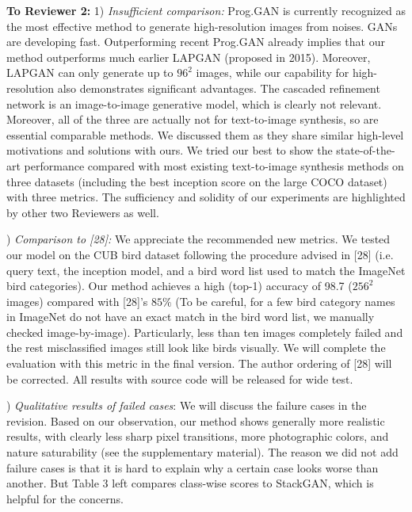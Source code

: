 \documentclass[10pt,twocolumn,letterpaper]{article}
\begin{document}
\noindent
\textbf{To Reviewer 2:} 1) \textit{Insufficient comparison: } Prog.GAN is currently recognized as the most effective method to generate high-resolution images from noises. GANs are developing fast. Outperforming recent Prog.GAN already implies that our method outperforms much earlier LAPGAN (proposed in 2015). Moreover, LAPGAN can only generate up to $96^2$ images, while our capability for high-resolution also demonstrates significant advantages. The cascaded refinement network is an image-to-image generative model, which is clearly not relevant. Moreover, all of the three are actually not for text-to-image synthesis, so are essential comparable methods. We discussed them as they share similar high-level motivations and solutions with ours. We tried our best to show the state-of-the-art performance compared with most existing text-to-image synthesis methods on three datasets (including the best inception score on the large COCO dataset) with three metrics. 
The sufficiency and solidity of our experiments are highlighted by other two Reviewers as well. 


) \textit{Comparison to [28]: } We appreciate the recommended new metrics. We tested our model on the CUB bird dataset following the procedure advised in [28] (i.e. query text, the inception model, and a bird word list used to match the ImageNet bird categories). Our method achieves a high (top-1) accuracy of 98.7 ($256^2$ images) compared with [28]'s $85\%$ (To be careful, for a few bird category names in ImageNet do not have an exact match in the bird word list, we manually checked image-by-image). Particularly, less than ten images completely failed and the rest misclassified images still look like birds visually. We will complete the evaluation with this metric in the final version. The author ordering of [28] will be corrected. All results with source code will be released for wide test. 


) \textit{Qualitative results of failed cases}: We will discuss the failure cases in the revision. Based on our observation, our method shows generally more realistic results, with clearly less sharp pixel transitions, more photographic colors, and nature saturability (see the supplementary material). 
The reason we did not add failure cases is that it is hard to explain why a certain case looks worse than another. But Table 3 left compares class-wise scores to StackGAN, which is helpful for the concerns. 
\end{document}
